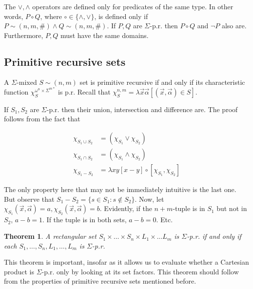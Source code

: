 \documentclass[a4paper, 12pt]{article}
\newtheorem{theorem}{Theorem}
\newtheorem{theorem}{Theorem}
\begin{document}
The $\lor, \land$ operators are defined only for predicates of the same type. In
other words, $P \circ Q$, where $\circ \in \{\land, \lor\}$, is defined only if
$P \sim (n, m, \#) \land Q \sim (n, m, \#)$. If $P, Q$ are $\Sigma$-p.r. then $P
\circ Q$ and $\neg P$ also are. Furthermore, $P, Q$ must have the same domains.

\subsection{Primitive recursive sets}

A $\Sigma$-mixed $S \sim (n, m)$ set is primitive recursive if and only if its
characteristic function $\chi_S^{\omega^n \times \Sigma^{m*}}$ is p.r. Recall
that $\chi_S^{n, m} = \lambda
\overrightarrow{x}\overrightarrow{\alpha}[(\overrightarrow{x},
\overrightarrow{\alpha}) \in S]$.

If $S_1, S_2$ are $\Sigma$-p.r. then their union, intersection and difference
are. The proof follows from the fact that 

\begin{align*}
    \chi_{S_1 \cup S_2} &= \left( \chi_{S_1} \lor \chi_{S_2} \right) \\ 
    \chi_{S_1 \cap S_2} &= \left( \chi_{S_1} \land \chi_{S_2} \right) \\ 
    \chi_{S_1 - S_2} &= \lambda xy[x - y] \circ \left[ \chi_{S_1}, \chi_{S_2} \right] 
\end{align*}

The only property here that may not be immediately intuitive is the last one.
But observe that $S_1 - S_2 = \{s \in S_1 : s \not\in S_2\}$. Now, let
$\chi_{S_1}(\overrightarrow{x}, \overrightarrow{\alpha}) = a,
\chi_{S_2}(\overrightarrow{x}, \overrightarrow{\alpha}) = b$. Evidently, if the
$n+m$-tuple is in $S_1$ but not in $S_2$, $a - b = 1$. If the tuple is in both
sets, $a - b = 0$. Etc.

\begin{theorem}
    A rectangular set $S_1 \times  \ldots \times  S_n \times  L_1 \times  \ldots
    L_m$ is $\Sigma$-p.r. if and only if each $S_1, \ldots, S_n, L_1, \ldots,
    L_m$ is $\Sigma$-p.r.
\end{theorem}

This theorem is important, insofar as it allows us to evaluate whether a
Cartesian product is $\Sigma$-p.r. only by looking at its set factors. This
theorem should follow from the properties of primitive recursive sets mentioned
before.
\end{document}
